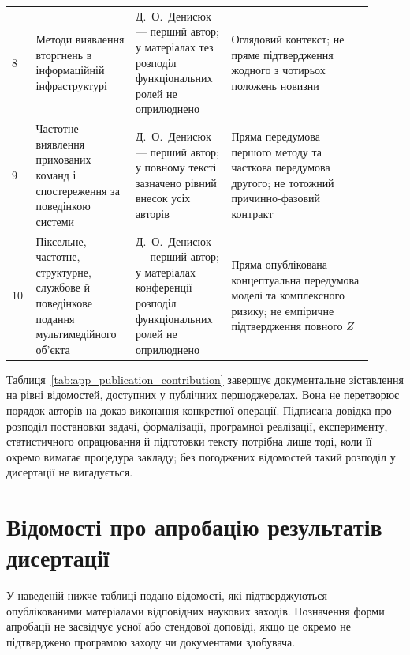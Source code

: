 \begin{landscape}
\begin{longtable}{@{}p{0.06\linewidth}p{0.25\linewidth}p{0.24\linewidth}p{0.36\linewidth}@{}}
8 & Методи виявлення вторгнень в інформаційній інфраструктурі & Д.~О.~Денисюк --- перший автор; у матеріалах тез розподіл функціональних ролей не оприлюднено & Оглядовий контекст; не пряме підтвердження жодного з чотирьох положень новизни \\
9 & Частотне виявлення прихованих команд і спостереження за поведінкою системи & Д.~О.~Денисюк --- перший автор; у повному тексті зазначено рівний внесок усіх авторів & Пряма передумова першого методу та часткова передумова другого; не тотожний причинно-фазовий контракт \\
10 & Піксельне, частотне, структурне, службове й поведінкове подання мультимедійного об’єкта & Д.~О.~Денисюк --- перший автор; у матеріалах конференції розподіл функціональних ролей не оприлюднено & Пряма опублікована концептуальна передумова моделі та комплексного ризику; не емпіричне підтвердження повного $Z$ \\
\end{longtable}
\end{landscape}

Таблиця~\ref{tab:app_publication_contribution} завершує документальне зіставлення на рівні відомостей, доступних у публічних першоджерелах. Вона не перетворює порядок авторів на доказ виконання конкретної операції. Підписана довідка про розподіл постановки задачі, формалізації, програмної реалізації, експерименту, статистичного опрацювання й підготовки тексту потрібна лише тоді, коли її окремо вимагає процедура закладу; без погоджених відомостей такий розподіл у дисертації не вигадується.

\section*{Відомості про апробацію результатів дисертації}
{}

У наведеній нижче таблиці подано відомості, які підтверджуються опублікованими матеріалами відповідних наукових заходів. Позначення форми апробації не засвідчує усної або стендової доповіді, якщо це окремо не підтверджено програмою заходу чи документами здобувача.

